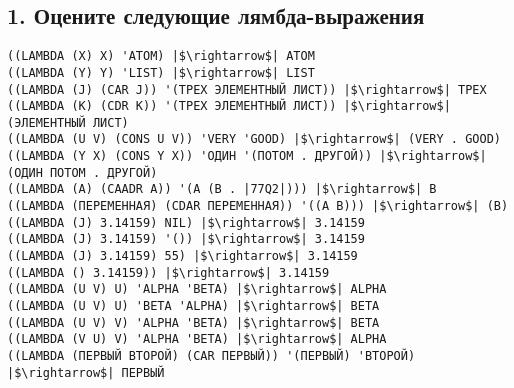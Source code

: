 \documentclass{amsart}
\begin{document}
\subsection{1. Оцените следующие лямбда-выражения}

\begin{verbatim}
((LAMBDA (X) X) 'ATOM) |$\rightarrow$| ATOM
((LAMBDA (Y) Y) 'LIST) |$\rightarrow$| LIST
((LAMBDA (J) (CAR J)) '(ТРЕХ ЭЛЕМЕНТНЫЙ ЛИСТ)) |$\rightarrow$| ТРЕХ
((LAMBDA (K) (CDR K)) '(ТРЕХ ЭЛЕМЕНТНЫЙ ЛИСТ)) |$\rightarrow$| (ЭЛЕМЕНТНЫЙ ЛИСТ)
((LAMBDA (U V) (CONS U V)) 'VERY 'GOOD) |$\rightarrow$| (VERY . GOOD)
((LAMBDA (Y X) (CONS Y X)) 'ОДИН '(ПОТОМ . ДРУГОЙ)) |$\rightarrow$| (ОДИН ПОТОМ . ДРУГОЙ)
((LAMBDA (A) (CAADR A)) '(A (B . |77Q2|))) |$\rightarrow$| B
((LAMBDA (ПЕРЕМЕННАЯ) (CDAR ПЕРЕМЕННАЯ)) '((A B))) |$\rightarrow$| (B)
((LAMBDA (J) 3.14159) NIL) |$\rightarrow$| 3.14159
((LAMBDA (J) 3.14159) '()) |$\rightarrow$| 3.14159
((LAMBDA (J) 3.14159) 55) |$\rightarrow$| 3.14159
((LAMBDA () 3.14159)) |$\rightarrow$| 3.14159
((LAMBDA (U V) U) 'ALPHA 'BETA) |$\rightarrow$| ALPHA
((LAMBDA (U V) U) 'BETA 'ALPHA) |$\rightarrow$| BETA
((LAMBDA (U V) V) 'ALPHA 'BETA) |$\rightarrow$| BETA
((LAMBDA (V U) V) 'ALPHA 'BETA) |$\rightarrow$| ALPHA
((LAMBDA (ПЕРВЫЙ ВТОРОЙ) (CAR ПЕРВЫЙ)) '(ПЕРВЫЙ) 'ВТОРОЙ) |$\rightarrow$| ПЕРВЫЙ
\end{verbatim}
\end{document}

